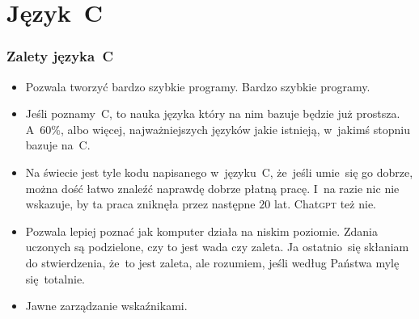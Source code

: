 \documentclass[10pt,t]{beamer}
\begin{document}
\section{Język~C %
}



\begin{frame}
  \frametitle{Zalety języka~C}


  \begin{itemize}

  \item Pozwala tworzyć bardzo szybkie programy. \alert{Bardzo szybkie}
      programy.

  \item Jeśli poznamy~C, to nauka języka który na nim bazuje będzie
    już prostsza. A~60\%, albo więcej, najważniejszych języków jakie
    istnieją, w~jakimś stopniu bazuje na~C.

  \item Na świecie jest tyle kodu napisanego w~języku~C, że~jeśli umie~się
    go dobrze, można dość łatwo znaleźć naprawdę dobrze płatną pracę. I~na
    razie nic nie wskazuje, by ta praca zniknęła przez następne $20$ lat.
    Chat\textsc{gpt} też nie.

  \item Pozwala lepiej poznać jak komputer działa na niskim poziomie.
    Zdania uczonych są podzielone, czy to jest wada czy zaleta. Ja
    ostatnio~się skłaniam do stwierdzenia, że~to jest zaleta, ale rozumiem,
    jeśli według Państwa mylę się~totalnie.

  \item Jawne zarządzanie wskaźnikami.

  \end{itemize}

\end{frame}
\end{document}
